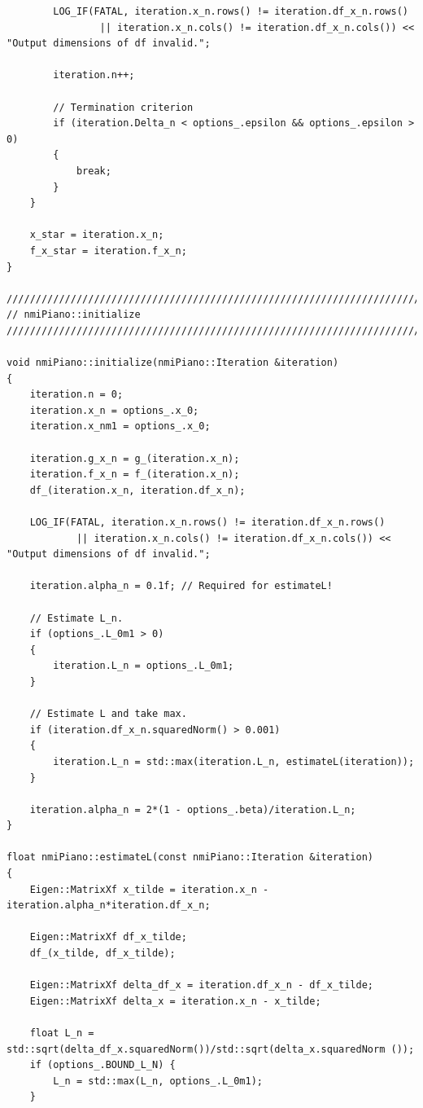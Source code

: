 \documentclass[onecolumn,final,a4paper,13pt,reqno]{siamart}
\begin{document}
\begin{appendix}
\begin{lstlisting}
        LOG_IF(FATAL, iteration.x_n.rows() != iteration.df_x_n.rows() 
                || iteration.x_n.cols() != iteration.df_x_n.cols()) << "Output dimensions of df invalid.";
        
        iteration.n++;
        
        // Termination criterion
        if (iteration.Delta_n < options_.epsilon && options_.epsilon > 0)
        {
            break;
        }
    }
    
    x_star = iteration.x_n;
    f_x_star = iteration.f_x_n;
}

////////////////////////////////////////////////////////////////////////////////
// nmiPiano::initialize
////////////////////////////////////////////////////////////////////////////////

void nmiPiano::initialize(nmiPiano::Iteration &iteration)
{
    iteration.n = 0;
    iteration.x_n = options_.x_0;
    iteration.x_nm1 = options_.x_0;
    
    iteration.g_x_n = g_(iteration.x_n);
    iteration.f_x_n = f_(iteration.x_n);
    df_(iteration.x_n, iteration.df_x_n);
    
    LOG_IF(FATAL, iteration.x_n.rows() != iteration.df_x_n.rows() 
            || iteration.x_n.cols() != iteration.df_x_n.cols()) << "Output dimensions of df invalid.";
    
    iteration.alpha_n = 0.1f; // Required for estimateL!
    
    // Estimate L_n.
    if (options_.L_0m1 > 0)
    {
        iteration.L_n = options_.L_0m1;
    }
    
    // Estimate L and take max.
    if (iteration.df_x_n.squaredNorm() > 0.001)
    {
        iteration.L_n = std::max(iteration.L_n, estimateL(iteration));
    }
    
    iteration.alpha_n = 2*(1 - options_.beta)/iteration.L_n;
}

float nmiPiano::estimateL(const nmiPiano::Iteration &iteration)
{
    Eigen::MatrixXf x_tilde = iteration.x_n - iteration.alpha_n*iteration.df_x_n;

    Eigen::MatrixXf df_x_tilde;
    df_(x_tilde, df_x_tilde);

    Eigen::MatrixXf delta_df_x = iteration.df_x_n - df_x_tilde;
    Eigen::MatrixXf delta_x = iteration.x_n - x_tilde;
    
    float L_n = std::sqrt(delta_df_x.squaredNorm())/std::sqrt(delta_x.squaredNorm ());
    if (options_.BOUND_L_N) {
        L_n = std::max(L_n, options_.L_0m1);
    }
    

\end{lstlisting}
\end{appendix}
\end{document}
